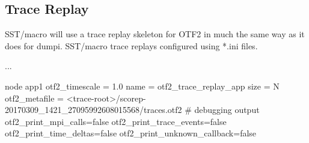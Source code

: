 \subsection{Trace Replay}
\label{subsec:otf:traceReplay}
SST/macro will use a trace replay skeleton for OTF2 in much the same way as it does for dumpi. SST/macro trace replays configured using *.ini files. 

\begin{ViFile}
...

node {
 app1 {
  otf2_timescale = 1.0
  name = otf2_trace_replay_app
  size = N
  otf2_metafile = <trace-root>/scorep-20170309_1421_27095992608015568/traces.otf2
 # debugging output
  otf2_print_mpi_calls=false
  otf2_print_trace_events=false
  otf2_print_time_deltas=false
  otf2_print_unknown_callback=false
 }
}

\end{ViFile}


